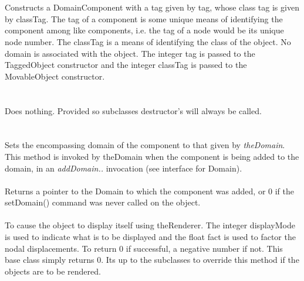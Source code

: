   \\
  \\
Constructs a DomainComponent with a tag given by \p tag, whose
class tag is given by \p classTag. The tag of
a component is some unique means of identifying the component among
like components, i.e. the tag of a node would be its unique node
number. The \p classTag is a means of identifying the class of the object.
No domain is associated with the object. The integer \p tag is
passed to the TaggedObject constructor and the integer \p classTag
is passed to the MovableObject constructor. \\

  \\
  \\
Does nothing. Provided so subclasses destructor's will always be
called. \\

  \\
 \\
Sets the encompassing domain of the component to that given by {\em
theDomain}. This method is invoked by \p theDomain when the component is
being added to the domain, in an {\em addDomain..} invocation (see
interface for Domain). \\

\\
Returns a pointer to the Domain to which the component was added,
or $0$ if the setDomain() command was never called on the
object. \\

 \\ 
To cause the object to display itself using \p theRenderer. The
integer \p displayMode is used to indicate what is to be displayed
and the float \p fact is used to factor the nodal displacements. 
To return $0$ if successful, a negative number if not. This base
class simply returns $0$. Its up to the subclasses to override this
method if the objects are to be rendered.

